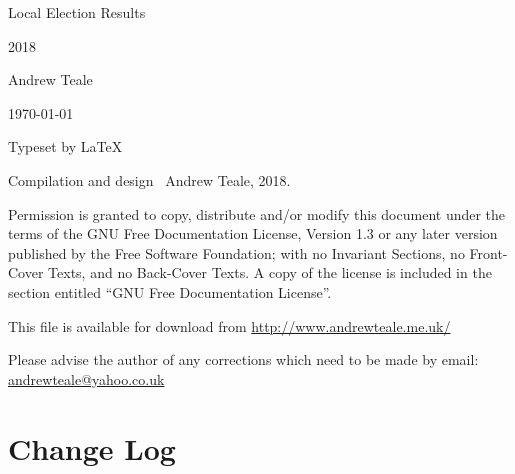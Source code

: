 \documentclass[a4paper,openany]{book}
\begin{document}

\begin{titlepage}

\begin{center}

\Huge Local Election Results

2018

\bigskip

\Large Andrew Teale

\vfill

\newcommand\versionno{0.10.1}


\today

\end{center}

\end{titlepage}


\begin{center}

\bigskip

Typeset by \LaTeX{} 

\bigskip

Compilation and design \textcopyright\ Andrew Teale, 2018.

 Permission is granted to copy, distribute and/or modify this document
 under the terms of the GNU Free Documentation License, Version 1.3
 or any later version published by the Free Software Foundation;
 with no Invariant Sections, no Front-Cover Texts, and no Back-Cover Texts.
 A copy of the license is included in the section entitled ``GNU
 Free Documentation License''.

\bigskip

This file is available for download from
\url{http://www.andrewteale.me.uk/}

\bigskip

Please advise the author of any corrections which need to be made by
email: \url{andrewteale@yahoo.co.uk}

\vfill
\end{center}

\section*{Change Log}


%
\end{document}
